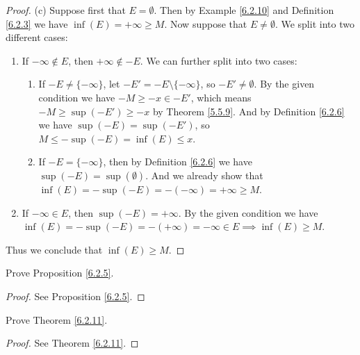 \begin{proof}{(c)}
      Suppose first that \(E = \emptyset\).
      Then by Example \ref{6.2.10} and Definition \ref{6.2.3} we have \(\inf(E) = +\infty \geq M\).
      Now suppose that \(E \neq \emptyset\).
      We split into two different cases:
      \begin{enumerate}[label=(\Roman*)]
            \item If \(-\infty \not\in E\), then \(+\infty \not\in -E\).
                  We can further split into two cases:
                  \begin{enumerate}[label=(\roman*)]
                        \item If \(-E \neq \{-\infty\}\), let \(-E' = -E \setminus \{-\infty\}\), so \(-E' \neq \emptyset\).
                              By the given condition we have \(-M \geq -x \in -E'\), which means \(-M \geq \sup(-E') \geq -x\) by Theorem \ref{5.5.9}.
                              And by Definition \ref{6.2.6} we have \(\sup(-E) = \sup(-E')\), so \(M \leq -\sup(-E) = \inf(E) \leq x\).
                        \item If \(-E = \{-\infty\}\), then by Definition \ref{6.2.6} we have \(\sup(-E) = \sup(\emptyset)\).
                              And we already show that \(\inf(E) = -\sup(-E) = -(-\infty) = +\infty \geq M\).
                  \end{enumerate}
            \item If \(-\infty \in E\), then \(\sup(-E) = +\infty\).
                  By the given condition we have \(\inf(E) = -\sup(-E) = -(+\infty) = -\infty \in E \implies \inf(E) \geq M\).
      \end{enumerate}
      Thus we conclude that \(\inf(E) \geq M\).
\end{proof}

\exercisesection

\begin{exercise}\label{ex 6.2.1}
      Prove Proposition \ref{6.2.5}.
\end{exercise}

\begin{proof}
      See Proposition \ref{6.2.5}.
\end{proof}

\begin{exercise}\label{ex 6.2.2}
      Prove Theorem \ref{6.2.11}.
\end{exercise}

\begin{proof}
      See Theorem \ref{6.2.11}.
\end{proof}